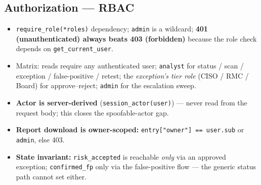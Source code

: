 \documentclass[11pt,a4paper]{article}
\newcommand{\code}[1]{\texttt{#1}}
\begin{document}
\subsection{Authorization --- RBAC}
\begin{itemize}
  \item \code{require\_role(*roles)} dependency; \code{admin} is a wildcard;
        \textbf{401 (unauthenticated) always beats 403 (forbidden)} because the
        role check depends on \code{get\_current\_user}.
  \item Matrix: reads require any authenticated user; \code{analyst} for
        status / scan / exception / false-positive / retest; the \emph{exception's
        tier role} (CISO / RMC / Board) for approve--reject; \code{admin} for the
        escalation sweep.
  \item \textbf{Actor is server-derived} (\code{session\_actor(user)}) --- never
        read from the request body; this closes the spoofable-actor gap.
  \item \textbf{Report download is owner-scoped:}
        \code{entry["owner"] == user.sub} or \code{admin}, else 403.
  \item \textbf{State invariant:} \code{risk\_accepted} is reachable \emph{only}
        via an approved exception; \code{confirmed\_fp} only via the
        false-positive flow --- the generic status path cannot set either.
\end{itemize}
\end{document}
